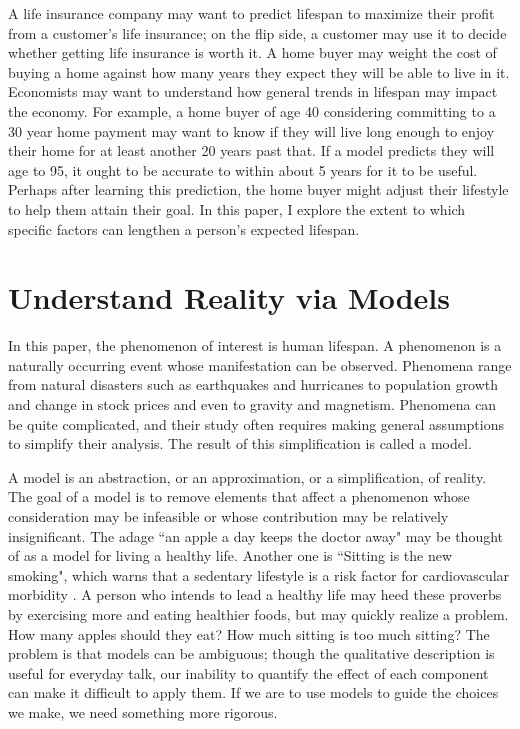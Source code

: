 \documentclass[12pt]{article}
\begin{document}
	A life insurance company may
	want to predict lifespan to maximize their profit from a customer's life
	insurance; on the flip side, a customer may use it to decide whether getting
	life insurance is worth it. A home buyer may weight the cost of buying
	a home against how many years they expect they will be able to live in it.
	Economists may want to understand how general trends in lifespan may
	impact the economy. For example, a home buyer of age 40 considering committing to
	a 30 year home payment may want to know if they will live long enough
	to enjoy their home for at least another 20 years past that. If a model
	predicts they will age to 95, it ought to be accurate to within about 5
	years for it to be useful. Perhaps after learning this prediction, the
	home buyer might adjust their lifestyle to help them attain their goal.
	In this paper, I explore the extent to which specific factors can
	lengthen a person's expected lifespan. 
	
	\section{Understand Reality via Models}
	In this paper, the phenomenon of interest is human lifespan.
	A phenomenon is a naturally occurring event whose manifestation can be observed.
	Phenomena range from natural disasters such as earthquakes and hurricanes to
	population growth and change in stock prices and even to gravity and magnetism.
	 Phenomena can
	be quite complicated, and their study often requires making general
	assumptions to simplify their analysis. The result of this simplification is
	called a model.
	
	A model is an abstraction, or an approximation, or a simplification, of reality.
	The goal of a model is to remove elements that affect a phenomenon whose consideration
	may be infeasible or whose contribution may be relatively insignificant.
	The adage ``an apple a day keeps the doctor away" may be thought of as a model
	for living a healthy life. Another one is ``Sitting is the new smoking",
	which warns that a sedentary lifestyle is a risk factor for cardiovascular
	morbidity \cite{NLoM-sitting-smoking}. A person who intends to lead a healthy
	life may heed these proverbs by exercising more and eating healthier foods,
	but may quickly realize a problem. How many apples should they eat? How
	much sitting is too much sitting? The problem is that models can be ambiguous;
	though the qualitative description is useful for everyday talk, our inability
	to quantify the effect of each component can make it difficult to apply them. If we are to
	use models to guide the choices we make, we need something more rigorous.
	
\end{document}
